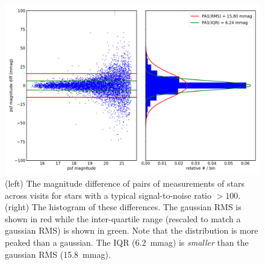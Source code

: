 \documentclass[\docopts]{\docclass}
\begin{document}
\begin{figure}
\centering
\includegraphics[width=0.9\columnwidth]{DC1-imsim-dithered_r_PA1.png}
\caption{(left) The magnitude difference of pairs of measurements of stars across visits for stars with a typical signal-to-noise ratio $>100$.  (right) The histogram of these differences.  The gaussian RMS is shown in red while the inter-quartile range (rescaled to match a gaussian RMS) is shown in green.  Note that the distribution is more peaked than a gaussian.  The IQR (6.2~mmag) is {\em smaller} than the gaussian RMS (15.8~mmag).}
\label{fig:validate_drp_PA1}
\end{figure}
\end{document}
